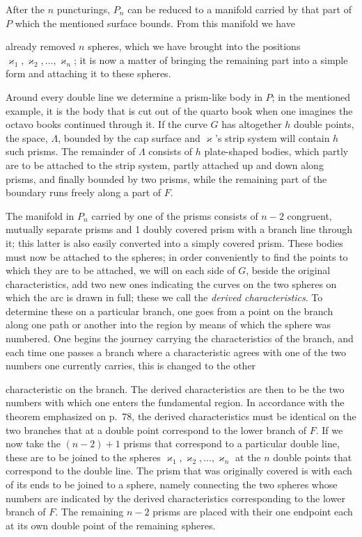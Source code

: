 \documentclass{article}
\begin{document}
After the $n$ puncturings, $P_n$ can be reduced to a manifold carried by that part of $P$ which the mentioned surface bounds. From this manifold we have

already removed $n$ spheres, which we have brought into the positions $\varkappa_1, \varkappa_2, \dots, \varkappa_n$; it is now a matter of bringing the remaining part into a simple form and attaching it to these spheres.

Around every double line we determine a prism-like body in $P$; in the mentioned example, it is the body that is cut out of the quarto book when one imagines the octavo books continued through it. If the curve $G$ has altogether $h$ double points, the space, $\Lambda$, bounded by the cap surface and $\varkappa$'s strip system will contain $h$ such prisms. The remainder of $\Lambda$ consists of $h$ plate-shaped bodies, which partly are to be attached to the strip system, partly attached up and down along prisms, and finally bounded by two prisms, while the remaining part of the boundary runs freely along a part of $F$.

The manifold in $P_n$ carried by one of the prisms consists of $n - 2$ congruent, mutually separate prisms and 1 doubly covered prism with a branch line through it; this latter is also easily converted into a simply covered prism. These bodies must now be attached to the spheres; in order conveniently to find the points to which they are to be attached, we will on each side of $G$, beside the original characteristics, add two new ones indicating the curves on the two spheres on which the arc is drawn in full; these we call the \emph{derived characteristics}. To determine these on a particular branch, one goes from a point on the branch along one path or another into the region by means of which the sphere was numbered. One begins the journey carrying the characteristics of the branch, and each time one passes a branch where a characteristic agrees with one of the two numbers one currently carries, this is changed to the other

characteristic on the branch. The derived characteristics are then to be the two numbers with which one enters the fundamental region. In accordance with the theorem emphasized on p.\ 78, the derived characteristics must be identical on the two branches that at a double point correspond to the lower branch of $F$. If we now take the $(n - 2) + 1$ prisms that correspond to a particular double line, these are to be joined to the spheres $\varkappa_1, \varkappa_2, \dots, \varkappa_n$ at the $n$ double points that correspond to the double line. The prism that was originally covered is with each of its ends to be joined to a sphere, namely connecting the two spheres whose numbers are indicated by the derived characteristics corresponding to the lower branch of $F$. The remaining $n - 2$ prisms are placed with their one endpoint each at its own double point of the remaining spheres.
\end{document}
